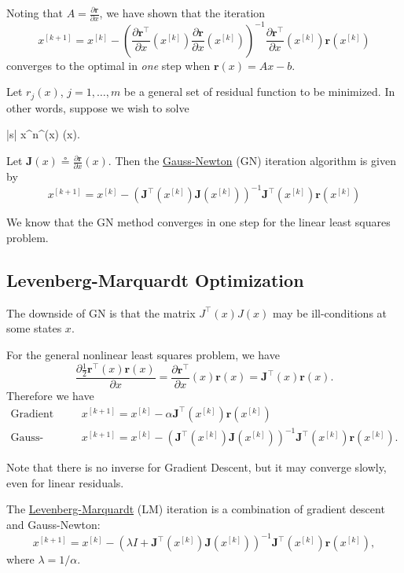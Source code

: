 \documentclass{article}
\newcommand{\defeq}{\circeq}
\newcommand{\rbf}{\mathbf{r}}
\newcommand{\Jbf}{\mathbf{J}}
\begin{document}
	Noting that $A = \frac{\partial \rbf}{\partial x}$, we have shown that the iteration
	\[
	x^{[k+1]} = x^{[k]} - \left(\frac{\partial \rbf^\top}{\partial x}(x^{[k]}) \frac{\partial \rbf}{\partial x}(x^{[k]})\right)^{-1} \frac{\partial \rbf^\top}{\partial x}(x^{[k]}) \rbf(x^{[k]})
	\]
	converges to the optimal in {\em one} step when $\rbf(x) = Ax-b$.

	Let $r_j(x)$, $j=1, \dots, m$ be a general set of residual function to be minimized.  In other words, suppose we wish to solve
	\begin{mini*}|s|
		{x\in{}^n}{\rbf^\top(x) \rbf(x)}{}{}.
	\end{mini*}
	Let $\Jbf(x) \defeq \frac{\partial \rbf}{\partial x}(x)$.  Then the \underline{Gauss-Newton} (GN) iteration algorithm is given by
	\[
		x^{[k+1]} = x^{[k]} - \left(\Jbf^\top(x^{[k]}) \Jbf(x^{[k]})\right)^{-1} \Jbf^\top(x^{[k]}) \rbf(x^{[k]})
	\]
	
	We know that the GN method converges in one step for the linear least squares problem.


\subsection{Levenberg-Marquardt Optimization}

	The downside of GN is that the matrix $J^\top(x) J(x)$ may be ill-conditions at some states $x$.
	
	For the general nonlinear least squares problem, we have
	\[
	\frac{\partial \frac{1}{2}\rbf^\top(x) \rbf(x)}{\partial x} = \frac{\partial \rbf^\top}{\partial x}(x) \rbf(x) = \Jbf^\top(x)\rbf(x).
	\]
	Therefore we have
	\begin{align*}
		\text{Gradient Descent} &\quad 	x^{[k+1]} = x^{[k]} - \alpha \Jbf^\top(x^{[k]}) \rbf(x^{[k]}) \\
		\text{Gauss-Newton} &\quad 	x^{[k+1]} = x^{[k]} - \left(\Jbf^\top(x^{[k]}) \Jbf(x^{[k]})\right)^{-1} \Jbf^\top(x^{[k]}) \rbf(x^{[k]}).		
	\end{align*}
	
	Note that there is no inverse for Gradient Descent, but it may converge slowly, even for linear residuals.


	The \underline{Levenberg-Marquardt} (LM) iteration is a combination of gradient descent and Gauss-Newton:
	\[
		x^{[k+1]} = x^{[k]} - \left(\lambda I + \Jbf^\top(x^{[k]}) \Jbf(x^{[k]})\right)^{-1} \Jbf^\top(x^{[k]}) \rbf(x^{[k]}),
	\]	
	where $\lambda = 1/\alpha$.  
	
\end{document}
